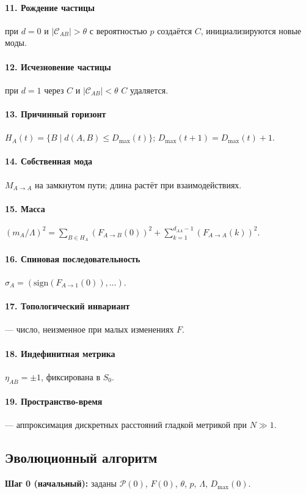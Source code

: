 \documentclass[12pt,a4paper]{article}
\begin{document}
\paragraph{11. Рождение частицы} при $d=0$ и $|\mathcal{C}_{AB}| > \theta$ с вероятностью $p$ создаётся $C$, инициализируются новые моды.
\paragraph{12. Исчезновение частицы} при $d=1$ через $C$ и $|\mathcal{C}_{AB}| < \theta$ $C$ удаляется.
\paragraph{13. Причинный горизонт} $H_A(t) = \{B \mid d(A,B) \le D_{\max}(t)\}$; $D_{\max}(t+1)=D_{\max}(t)+1$.
\paragraph{14. Собственная мода} $M_{A \to A}$ на замкнутом пути; длина растёт при взаимодействиях.
\paragraph{15. Масса} $(m_A/\Lambda)^2 = \sum_{B \in H_A} (F_{A \to B}(0))^2 + \sum_{k=1}^{d_{AA}-1} (F_{A \to A}(k))^2$.
\paragraph{16. Спиновая последовательность} $\sigma_A = (\text{sign}(F_{A \to 1}(0)), \dots)$.
\paragraph{17. Топологический инвариант} --- число, неизменное при малых изменениях $F$.
\paragraph{18. Индефинитная метрика} $\eta_{AB} = \pm 1$, фиксирована в $S_0$.
\paragraph{19. Пространство-время} --- аппроксимация дискретных расстояний гладкой метрикой при $N \gg 1$.

\subsection{Эволюционный алгоритм}
\textbf{Шаг 0 (начальный):} заданы $\mathcal{P}(0)$, $F(0)$, $\theta$, $p$, $\Lambda$, $D_{\max}(0)$.
\end{document}
